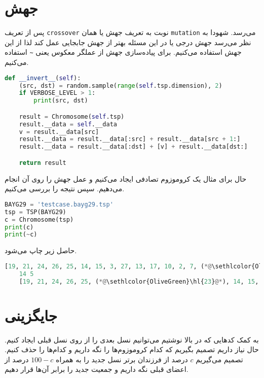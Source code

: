 \documentclass[a4paper, 12pt]{article}
\theoremstyle{definition}
\begin{document}
\section{جهش}
پس از تعریف
\texttt{crossover}
نوبت به تعریف جهش یا همان
\texttt{mutation}
می‌رسد. شهودا به نظر می‌رسد جهش درجی یا
در این مسئله بهتر از جهش جابجایی عمل کند لذا از این جهش استفاده می‌کنیم. برای پیاده‌سازی جهش از عملگر معکوس یعنی
\texttt{\textasciitilde}
استفاده می‌کنیم.

\LTR
\begin{lstlisting}[language=Python]
def __invert__(self):
    (src, dst) = random.sample(range(self.tsp.dimension), 2)
    if VERBOSE_LEVEL > 1:
        print(src, dst)

    result = Chromosome(self.tsp)
    result.__data = self.__data
    v = result.__data[src]
    result.__data = result.__data[:src] + result.__data[src + 1:]
    result.__data = result.__data[:dst] + [v] + result.__data[dst:]

    return result
\end{lstlisting}
\RTL

حال برای مثال یک کروموزوم تصادفی ایجاد می‌کنیم و عمل جهش را روی آن انجام می‌دهیم. سپس نتیجه را بررسی می‌کنیم.

\LTR
\begin{lstlisting}[language=Python]
BAYG29 = 'testcase.bayg29.tsp'
tsp = TSP(BAYG29)
c = Chromosome(tsp)
print(c)
print(~c)    
\end{lstlisting}
\RTL
حاصل زیر چاپ می‌شود.

\LTR
\begin{lstlisting}[language=Python]
    [19, 21, 24, 26, 25, 14, 15, 3, 27, 13, 17, 10, 2, 7, (*@\sethlcolor{OliveGreen}\hl{23}@*), 9, 4, 22, 0, 8, 6, 16, 12, 28, 11, 20, 5, 18, 1]: 4649
    14 5
    [19, 21, 24, 26, 25, (*@\sethlcolor{OliveGreen}\hl{23}@*), 14, 15, 3, 27, 13, 17, 10, 2, 7, 9, 4, 22, 0, 8, 6, 16, 12, 28, 11, 20, 5, 18, 1]: 4738  
\end{lstlisting}
\RTL

\section{جایگزینی}
به کمک کدهایی که در بالا نوشتیم می‌توانیم نسل بعدی را از روی نسل قبلی ایجاد کنیم. حال نیاز داریم تصمیم بگیریم که کدام کروموزوم‌ها را نگه داریم و کدام‌ها را حذف کنیم. تصمیم می‌گیریم
$c$
درصد از فرزندان برتر نسل جدید را به همراه
$100-c$
درصد از اعضای قبلی نگه داریم و جمعیت جدید را برابر آن‌ها قرار دهیم.
\end{document}
